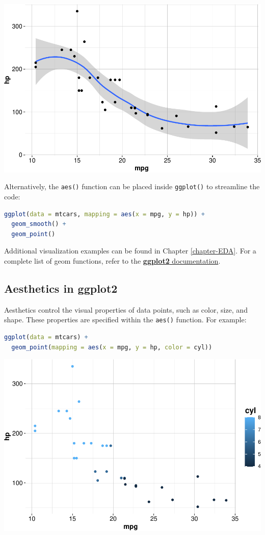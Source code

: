 \documentclass[
]{book}
\newcommand{\passthrough}[1]{#1}
\theoremstyle{definition}
\theoremstyle{definition}
\theoremstyle{definition}
\theoremstyle{definition}
\theoremstyle{remark}
\begin{document}
\begin{center}\includegraphics[width=0.7\linewidth]{Intro-R_files/figure-latex/unnamed-chunk-35-1} \end{center}

Alternatively, the \passthrough{\lstinline!aes()!} function can be placed inside \passthrough{\lstinline!ggplot()!} to streamline the code:

\begin{lstlisting}[language=R]
ggplot(data = mtcars, mapping = aes(x = mpg, y = hp)) +
  geom_smooth() + 
  geom_point()
\end{lstlisting}

Additional visualization examples can be found in Chapter \ref{chapter-EDA}. For a complete list of geom functions, refer to the \href{https://ggplot2.tidyverse.org}{\textbf{ggplot2} documentation}.

\subsection*{Aesthetics in ggplot2}\label{aesthetics-in-ggplot2}

Aesthetics control the visual properties of data points, such as color, size, and shape. These properties are specified within the \passthrough{\lstinline!aes()!} function. For example:

\begin{lstlisting}[language=R]
ggplot(data = mtcars) +
  geom_point(mapping = aes(x = mpg, y = hp, color = cyl))
\end{lstlisting}

\begin{center}\includegraphics[width=0.7\linewidth]{Intro-R_files/figure-latex/unnamed-chunk-37-1} \end{center}
\end{document}
